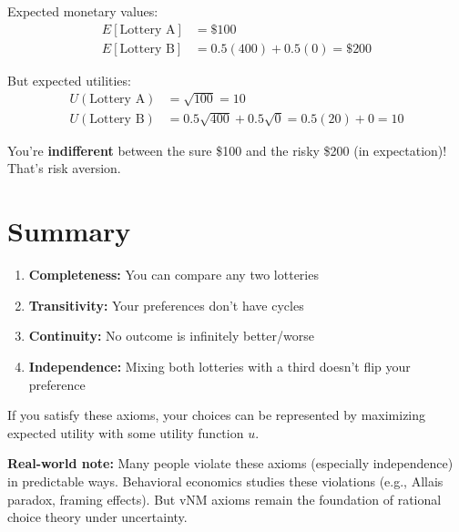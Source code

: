 \documentclass[12pt]{article}
\begin{document}
Expected monetary values:
\begin{align*}
E[\text{Lottery A}] &= \$100 \\
E[\text{Lottery B}] &= 0.5(400) + 0.5(0) = \$200
\end{align*}

But expected utilities:
\begin{align*}
U(\text{Lottery A}) &= \sqrt{100} = 10 \\
U(\text{Lottery B}) &= 0.5\sqrt{400} + 0.5\sqrt{0} = 0.5(20) + 0 = 10
\end{align*}

You're \textbf{indifferent} between the sure \$100 and the risky \$200 (in expectation)! That's risk aversion.

\newpage

\section{Summary}

\begin{tcolorbox}[colback=green!10,colframe=green!50!black,title=Key Takeaways]
\begin{enumerate}
\item \textbf{Completeness:} You can compare any two lotteries
\item \textbf{Transitivity:} Your preferences don't have cycles
\item \textbf{Continuity:} No outcome is infinitely better/worse
\item \textbf{Independence:} Mixing both lotteries with a third doesn't flip your preference
\end{enumerate}

\vspace{0.2cm}

If you satisfy these axioms, your choices can be represented by maximizing expected utility with some utility function $u$.

\vspace{0.2cm}

\textbf{Real-world note:} Many people violate these axioms (especially independence) in predictable ways. Behavioral economics studies these violations (e.g., Allais paradox, framing effects). But vNM axioms remain the foundation of rational choice theory under uncertainty.
\end{tcolorbox}
\end{document}
